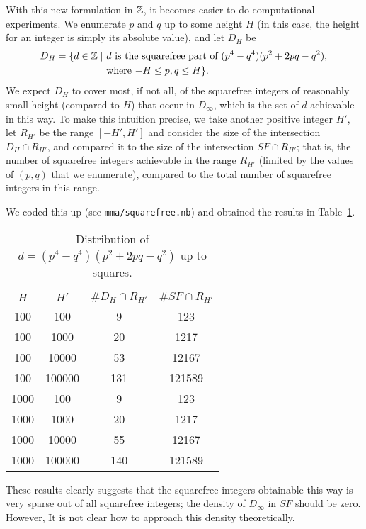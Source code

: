 With this new formulation in $\mathbb{Z}$, it becomes easier to do
computational experiments. We enumerate $p$ and $q$ up to some height
$H$ (in this case, the height for an integer is simply its absolute
value), and let $D_H$ be
\[
\begin{aligned}
  D_H = \{ d \in \mathbb{Z} \mid\ &
  \text{$d$ is the squarefree part of $(p^4 - q^4)(p^2 + 2pq - q^2)$},
  \\
  & \text{where $-H \le p, q \le H$}\}.
\end{aligned}
\]
We expect $D_H$ to cover most, if not all, of the squarefree integers
of reasonably small height (compared to $H$) that occur in $D_\infty$,
which is the set of $d$ achievable in this way. To make this intuition
precise, we take another positive integer $H'$, let $R_{H'}$ be the range
$[-H', H']$ and consider the size of the intersection $D_H \cap
R_{H'}$, and compared it to the size of the intersection $SF \cap
R_{H'}$; that is, the number of squarefree integers achievable in the
range $R_{H'}$ (limited by the values of $(p, q)$ that we enumerate),
compared to the total number of squarefree integers in this range.

We coded this up (see \texttt{mma/squarefree.nb}) and obtained the
results in Table~\ref{tab:squarefree}.

\begin{table}[hbtp]
  \centering
  \begin{tabular}{| c | c | c | c |}
    \hline
    $H$ & $H'$ & $\# D_H \cap R_{H'}$ & $\# SF \cap R_{H'}$ \\ \hline
    100 & 100 & 9 & 123 \\ \hline
    100 & 1000 & 20 & 1217 \\ \hline
    100 & 10000 & 53 & 12167 \\ \hline
    100 & 100000 & 131 & 121589 \\ \hline
    1000 & 100 & 9 & 123 \\ \hline
    1000 & 1000 & 20 & 1217 \\ \hline
    1000 & 10000 & 55 & 12167 \\ \hline
    1000 & 100000 & 140 & 121589 \\ \hline
  \end{tabular}
  \caption{Distribution of $d = (p^4 - q^4)(p^2 + 2pq - q^2)$ up to
    squares.}
  \label{tab:squarefree}
\end{table}

These results clearly suggests that the squarefree integers obtainable
this way is very sparse out of all squarefree integers; the density of
$D_\infty$ in $SF$ should be zero. However, It is not clear how to
approach this density theoretically.

